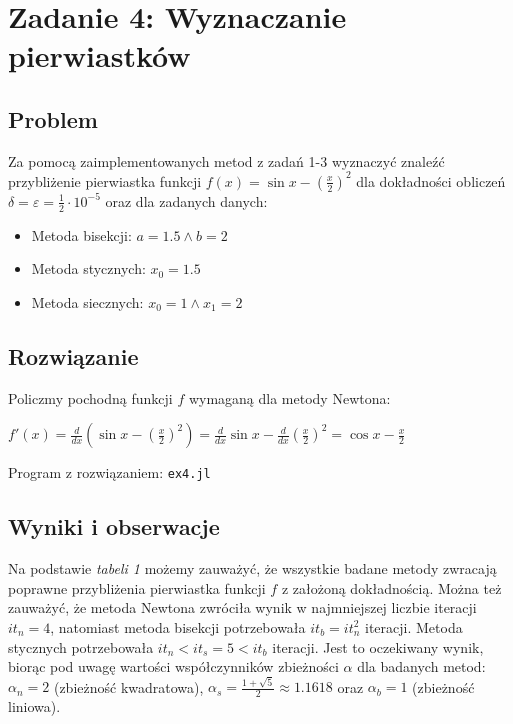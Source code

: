 \documentclass[11pt]{article}
\begin{document}
    \newpage

\section*{Zadanie 4: Wyznaczanie pierwiastków}
    \subsection*{Problem}
        Za pomocą zaimplementowanych metod z zadań 1-3 wyznaczyć znaleźć przybliżenie pierwiastka
        funkcji $f(x) = \sin{x} - (\frac{x}{2})^2$ dla dokładności obliczeń 
        $\delta = \varepsilon = \frac{1}{2} \cdot 10^{-5}$ oraz dla zadanych danych:
        \begin{itemize}
            \item Metoda bisekcji: $a = 1.5 \land b = 2$
            \item Metoda stycznych: $x_0 = 1.5$
            \item Metoda siecznych: $x_0 = 1 \land x_1 = 2$
        \end{itemize}

    \subsection*{Rozwiązanie}
        Policzmy pochodną funkcji $f$ wymaganą dla metody Newtona:
        \begin{center}
        \begin{math}
            f'(x) = \frac{d}{dx}(\sin{x} - (\frac{x}{2})^2) 
                = \frac{d}{dx}\sin{x} - \frac{d}{dx}(\frac{x}{2})^2
                = \cos{x} - \frac{x}{2}
        \end{math}
        \end{center}
        \noindent \newline
        Program z rozwiązaniem: \texttt{ex4.jl}
        
    \subsection*{Wyniki i obserwacje}
        Na podstawie \textit{tabeli 1} możemy zauważyć, że wszystkie badane metody zwracają poprawne przybliżenia 
        pierwiastka funkcji $f$ z założoną dokładnością. Można też zauważyć, że metoda Newtona zwróciła wynik w 
        najmniejszej liczbie iteracji $it_n = 4$, natomiast metoda bisekcji potrzebowała $it_b = it_n^2$ iteracji.
        Metoda stycznych potrzebowała $it_n < it_s = 5 < it_b$ iteracji. Jest to oczekiwany wynik, biorąc pod uwagę
        wartości współczynników zbieżności $\alpha$ dla badanych metod: $\alpha_n = 2$ (zbieżność kwadratowa), 
        $\alpha_s = \frac{1 + \sqrt{5}}{2} \approx 1.1618$ oraz $\alpha_b = 1$ (zbieżność liniowa).
\end{document}
